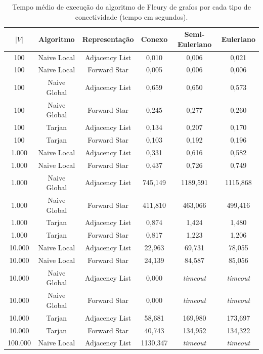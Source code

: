 \documentclass[12pt]{article}
\begin{document}
\begin{table}[ht]
\centering
\caption{Tempo médio de execução do algoritmo de Fleury de grafos por cada tipo de conectividade (tempo em segundos).}
\label{tab:resultados}
\begin{tabular}{cccccc}
\hline
$|V|$ & \textbf{Algoritmo} & \textbf{Representação} & \textbf{Conexo} & \textbf{Semi-Euleriano} & \textbf{Euleriano} \\
\hline
100	    & Naive Local	& Adjacency List & 0,010    & 0,006    & 0,021 \\
100	    & Naive Local	& Forward Star   & 0,005    & 0,006    & 0,006 \\
100	    & Naive Global	& Adjacency List & 0,659    & 0,650    & 0,573 \\
100	    & Naive Global	& Forward Star   & 0,245    & 0,277    & 0,260 \\
100	    & Tarjan	    & Adjacency List & 0,134    & 0,207    & 0,170 \\
100	    & Tarjan	    & Forward Star   & 0,103    & 0,192    & 0,196 \\
\hline
1.000	& Naive Local	& Adjacency List & 0,331    & 0,616    & 0,582 \\
1.000	& Naive Local	& Forward Star   & 0,437    & 0,726    & 0,749 \\
1.000	& Naive Global	& Adjacency List & 745,149  & 1189,591 & 1115,868 \\
1.000	& Naive Global	& Forward Star   & 411,810  & 463,066  & 499,416 \\
1.000	& Tarjan	    & Adjacency List & 0,874    & 1,424    & 1,480 \\
1.000	& Tarjan	    & Forward Star   & 0,817    & 1,223    & 1,206 \\
\hline
10.000	& Naive Local	& Adjacency List & 22,963   & 69,731   & 78,055 \\
10.000	& Naive Local	& Forward Star   & 24,139   & 84,587   & 85,056 \\
10.000	& Naive Global	& Adjacency List & 0,000    & \textit{timeout}  & \textit{timeout} \\
10.000	& Naive Global	& Forward Star   & 0,000    & \textit{timeout}  & \textit{timeout} \\
10.000	& Tarjan	    & Adjacency List & 58,681   & 169,980  & 173,697 \\
10.000	& Tarjan	    & Forward Star   & 40,743   & 134,952  & 134,322 \\
\hline
100.000 & Naive Local    & Adjacency List & 1130,347 & \textit{timeout}  & \textit{timeout} \\

\end{tabular}
\end{table}
\end{document}
